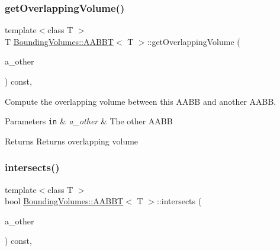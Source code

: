 \subsubsection{\texorpdfstring{get\+Overlapping\+Volume()}{getOverlappingVolume()}}
{\footnotesize\ttfamily template$<$class T $>$ \\
T \hyperlink{classBoundingVolumes_1_1AABBT}{Bounding\+Volumes\+::\+A\+A\+B\+BT}$<$ T $>$\+::get\+Overlapping\+Volume (\begin{DoxyParamCaption}\item[{const \hyperlink{classBoundingVolumes_1_1AABBT}{A\+A\+B\+BT}$<$ T $>$ \&}]{a\+\_\+other }\end{DoxyParamCaption}) const\hspace{0.3cm}{\ttfamily [inline]}, {\ttfamily [noexcept]}}



Compute the overlapping volume between this A\+A\+BB and another A\+A\+BB. 


\begin{DoxyParams}[1]{Parameters}
\mbox{\tt in}  & {\em a\+\_\+other} & The other A\+A\+BB \\
\hline
\end{DoxyParams}
\begin{DoxyReturn}{Returns}
Returns overlapping volume 
\end{DoxyReturn}
\mbox{\label{classBoundingVolumes_1_1AABBT_a87d160a3e05082e34e37d8b4472bad7d}} 
\subsubsection{\texorpdfstring{intersects()}{intersects()}}
{\footnotesize\ttfamily template$<$class T $>$ \\
bool \hyperlink{classBoundingVolumes_1_1AABBT}{Bounding\+Volumes\+::\+A\+A\+B\+BT}$<$ T $>$\+::intersects (\begin{DoxyParamCaption}\item[{const \hyperlink{classBoundingVolumes_1_1AABBT}{A\+A\+B\+BT}$<$ T $>$ \&}]{a\+\_\+other }\end{DoxyParamCaption}) const\hspace{0.3cm}{\ttfamily [inline]}, {\ttfamily [noexcept]}}



